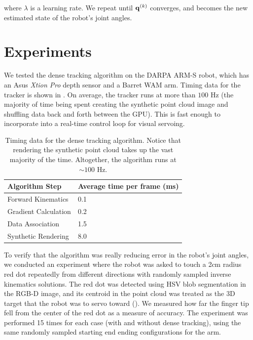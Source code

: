 \noindent where $\lambda$ is a learning rate. We repeat until $\mathbf{q}^{(k)}$ converges, and becomes the new estimated state of the robot's joint angles.

\section{Experiments}

We tested the dense tracking algorithm on the DARPA ARM-S robot, which has an Asus \textit{Xtion Pro} depth sensor and a Barret WAM arm. Timing data for the tracker is shown in . On average, the tracker runs at more than $100$ Hz (the majority of time being spent creating the synthetic point cloud image and shuffling data back and forth between the GPU). This is fast enough to incorporate into a real-time control loop for visual servoing.

\begin{table}
\centering
\begin{tabular} {l|l}
    Algorithm Step     & Average time per frame (ms) \\
    \hline
	Forward Kinematics & 0.1 \\
	Gradient Calculation & 0.2  \\
	Data Association & 1.5  \\
	Synthetic Rendering & 8.0
\end{tabular}
\caption{Timing data for the dense tracking algorithm. Notice that rendering the synthetic point cloud takes up the vast majority of the time. Altogether, the algorithm runs at $\sim100$ Hz.}
\label{tab:dense_track_time}
\end{table}

To verify that the algorithm was really reducing error in the robot's joint angles, we conducted an experiment where the robot was asked to touch a 2cm radius red dot repeatedly from different directions with randomly sampled inverse kinematics solutions. The red dot was detected using HSV blob segmentation in the RGB-D image, and its centroid in the point cloud was treated as the 3D target that the robot was to servo toward (). We measured how far the finger tip fell from the center of the red dot as a measure of accuracy. The experiment was performed 15 times for each case (with and without dense tracking), using the same randomly sampled starting end ending configurations for the arm.

